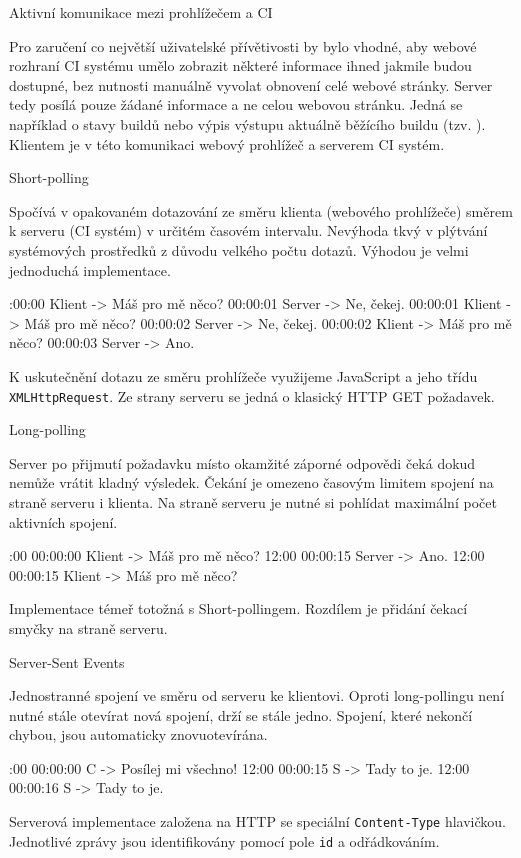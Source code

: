 \sec Aktivní komunikace mezi prohlížečem a CI

Pro zaručení co největší uživatelské přívětivosti by bylo vhodné, aby webové rozhraní CI systému umělo zobrazit některé informace ihned jakmile budou dostupné, bez nutnosti manuálně vyvolat obnovení celé webové stránky.
Server tedy posílá pouze žádané informace a ne celou webovou stránku.
Jedná se například o stavy buildů nebo výpis výstupu aktuálně běžícího buildu (tzv. ).
Klientem je v této komunikaci webový prohlížeč a serverem CI systém.

\secc Short-polling

Spočívá v opakovaném dotazování ze směru klienta (webového prohlížeče) směrem k serveru (CI systém) v určitém časovém intervalu.
Nevýhoda tkvý v plýtvání systémových prostředků z důvodu velkého počtu dotazů.
Výhodou je velmi jednoduchá implementace.

:00:00 Klient -> Máš pro mě něco?
00:00:01 Server -> Ne, čekej.
00:00:01 Klient -> Máš pro mě něco?
00:00:02 Server -> Ne, čekej.
00:00:02 Klient -> Máš pro mě něco?
00:00:03 Server -> Ano.
\endtt

\noindent
K uskutečnění dotazu ze směru prohlížeče využijeme JavaScript a jeho třídu {\tt XMLHttpRequest}.
Ze strany serveru se jedná o klasický HTTP GET požadavek.

\secc Long-polling

Server po přijmutí požadavku místo okamžité záporné odpovědi čeká dokud nemůže vrátit kladný výsledek.
Čekání je omezeno časovým limitem spojení na straně serveru i klienta.
Na straně serveru je nutné si pohlídat maximální počet aktivních spojení.

:00 00:00:00 Klient -> Máš pro mě něco?
12:00 00:00:15 Server -> Ano.
12:00 00:00:15 Klient -> Máš pro mě něco?
\endtt

\noindent
Implementace témeř totožná s Short-pollingem.
Rozdílem je přidání čekací smyčky na straně serveru.

\secc Server-Sent Events

Jednostranné spojení ve směru od serveru ke klientovi.
Oproti long-pollingu není nutné stále otevírat nová spojení, drží se stále jedno.
Spojení, které nekončí chybou, jsou automaticky znovuotevírána.

:00 00:00:00 C -> Posílej mi všechno!
12:00 00:00:15 S -> Tady to je.
12:00 00:00:16 S -> Tady to je.
\endtt

\noindent
Serverová implementace založena na HTTP se speciální {\tt Content-Type} hlavičkou.
Jednotlivé zprávy jsou identifikovány pomocí pole {\tt id} a odřádkováním.

